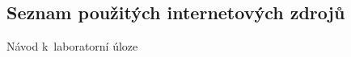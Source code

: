 \documentclass[a4paper,12pt]{article}   %
\begin{document}
\clearpage
\renewcommand{\refname}{Seznam použité literatury a~zdrojů informací} 

\begin{thebibliography}{99}

\subsection*{Seznam použitých internetových zdrojů}
     Návod k~laboratorní úloze
    
\end{thebibliography}
\end{document}
